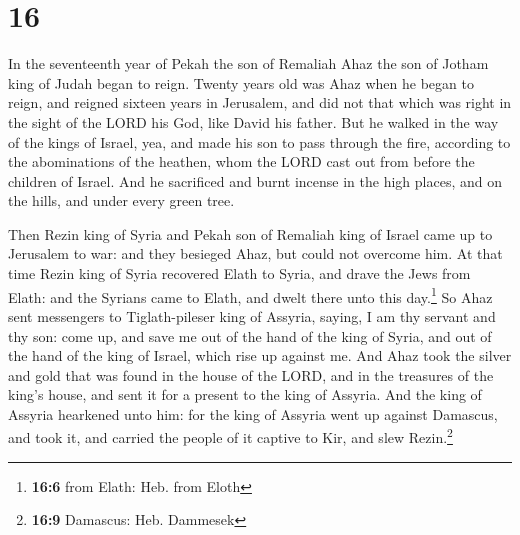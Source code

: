 \hypertarget{section-15}{%
\section{16}\label{section-15}}

 In the seventeenth year of Pekah the son of Remaliah Ahaz
the son of Jotham king of Judah began to reign.  Twenty
years old was Ahaz when he began to reign, and reigned sixteen years in
Jerusalem, and did not that which was right in the sight of the LORD his
God, like David his father.  But he walked in the way of
the kings of Israel, yea, and made his son to pass through the fire,
according to the abominations of the heathen, whom the LORD cast out
from before the children of Israel.  And he sacrificed and
burnt incense in the high places, and on the hills, and under every
green tree.

 Then Rezin king of Syria and Pekah son of Remaliah king
of Israel came up to Jerusalem to war: and they besieged Ahaz, but could
not overcome him.  At that time Rezin king of Syria
recovered Elath to Syria, and drave the Jews from Elath: and the Syrians
came to Elath, and dwelt there unto this day.\footnote{\textbf{16:6}
  from Elath: Heb. from Eloth}  So Ahaz sent messengers to
Tiglath-pileser king of Assyria, saying, I am thy servant and thy son:
come up, and save me out of the hand of the king of Syria, and out of
the hand of the king of Israel, which rise up against me. 
And Ahaz took the silver and gold that was found in the house of the
LORD, and in the treasures of the king's house, and sent it for a
present to the king of Assyria.  And the king of Assyria
hearkened unto him: for the king of Assyria went up against Damascus,
and took it, and carried the people of it captive to Kir, and slew
Rezin.\footnote{\textbf{16:9} Damascus: Heb. Dammesek}

